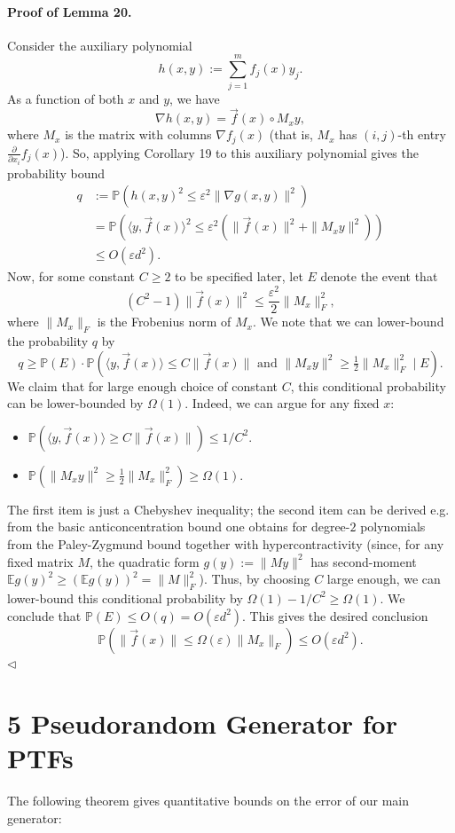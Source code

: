 \paragraph{Proof of Lemma 20.} Consider the auxiliary polynomial
\[h(x,y):=\sum_{j=1}^mf_j(x)y_j.\]
As a function of both $x$ and $y$, we have
\[\nabla h(x,y)=\vec f(x)\circ M_xy,\]
where $M_x$ is the matrix with columns $\nabla f_j(x)$ (that is, $M_x$ has $(i,j)$-th entry $\frac\partial{\partial x_i}f_j(x)$). So, applying Corollary 19 to this auxiliary polynomial gives the probability bound
\begin{align*}
q&:=\mathbb P(h(x,y)^2\leq\varepsilon^2\|\nabla g(x,y)\|^2)\\
&=\mathbb P(\langle y,\vec f(x)\rangle^2\leq\varepsilon^2(\|\vec f(x)\|^2+\|M_xy\|^2))\\
&\leq O(\varepsilon d^2).
\end{align*}
Now, for some constant $C\geq2$ to be specified later, let $E$ denote the event that
\[(C^2-1)\|\vec f(x)\|^2\leq\frac{\varepsilon^2}2\|M_x\|_F^2,\]
where $\|M_x\|_F$ is the Frobenius norm of $M_x$. We note that we can lower-bound the probability $q$ by
\[q\geq\mathbb P(E)\cdot\mathbb P(\langle y,\vec f(x)\rangle\leq C\|\vec f(x)\|\text{ and }\|M_xy\|^2\geq\tfrac12\|M_x\|_F^2\mid E).\]
We claim that for large enough choice of constant $C$, this conditional probability can be lower-bounded by $\Omega(1)$. Indeed, we can argue for any fixed $x$:
\begin{itemize}
\item $\mathbb P(\langle y,\vec f(x)\rangle\geq C\|\vec f(x)\|)\leq1/C^2$.
\item $\mathbb P(\|M_xy\|^2\geq\tfrac12\|M_x\|_F^2)\geq\Omega(1)$.
\end{itemize}
The first item is just a Chebyshev inequality; the second item can be derived e.g. from the basic anticoncentration bound one obtains for degree-$2$ polynomials from the Paley-Zygmund bound together with hypercontractivity (since, for any fixed matrix $M$, the quadratic form $g(y):=\|My\|^2$ has second-moment $\mathbb Eg(y)^2\geq(\mathbb Eg(y))^2=\|M\|_F^2$).
Thus, by choosing $C$ large enough, we can lower-bound this conditional probability by $\Omega(1)-1/C^2\geq\Omega(1)$.
We conclude that $\mathbb P(E)\leq O(q)=O(\varepsilon d^2)$. This gives the desired conclusion
\[\mathbb P(\|\vec f(x)\|\leq\Omega(\varepsilon)\|M_x\|_F)\leq O(\varepsilon d^2).\]\hfill$\triangleleft$
\section*{5 Pseudorandom Generator for PTFs}
The following theorem gives quantitative bounds on the error of our main generator:
